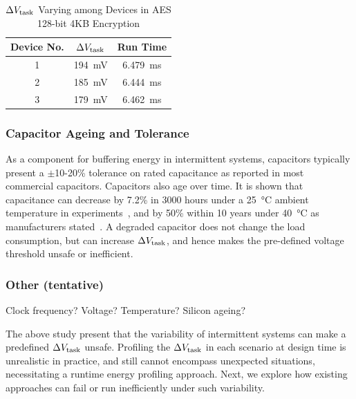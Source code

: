 \begin{table}[!t]
    \renewcommand{\arraystretch}{1.2}
    \centering
    \caption{$\Delta V_{\text{task}}$ Varying among Devices in AES 128-bit 4KB Encryption}
    \label{tab:device}
    \begin{tabular}{|c|c|c|}
    \hline
    \textbf{Device No.} & \textbf{$\Delta V_{\text{task}}$} & \textbf{Run Time} \\
    \hline
    1 & \SI{194}{\milli\volt} & \SI{6.479}{\milli\second} \\
    2 & \SI{185}{\milli\volt} & \SI{6.444}{\milli\second} \\
    3 & \SI{179}{\milli\volt} & \SI{6.462}{\milli\second} \\
    \hline
    \end{tabular}
\end{table}

\subsubsection{Capacitor Ageing and Tolerance}
\label{subsubsec:capacitance_variability}

As a component for buffering energy in intermittent systems, capacitors typically present a $\pm$10-20\% tolerance on rated capacitance as reported in most commercial capacitors. 
Capacitors also age over time. 
It is shown that capacitance can decrease by 7.2\% in 3000 hours under a \SI{25}{\celsius} ambient temperature in experiments~\cite{kulkarni2010experimental}, and by 50\% within 10 years under \SI{40}{\celsius} as manufacturers stated~\cite{vishaycapacitor}.
A degraded capacitor does not change the load consumption, but can increase $\Delta V_{\text{task}}$, and hence makes the pre-defined voltage threshold unsafe or inefficient. 

\subsubsection{Other (tentative)}

Clock frequency? Voltage? Temperature? Silicon ageing?


The above study present that the variability of intermittent systems can make a predefined $\Delta V_{\text{task}}$ unsafe. 
Profiling the $\Delta V_{\text{task}}$ in each scenario at design time is unrealistic in practice, and still cannot encompass unexpected situations, necessitating a runtime energy profiling approach. 
Next, we explore how existing approaches can fail or run inefficiently under such variability. 




